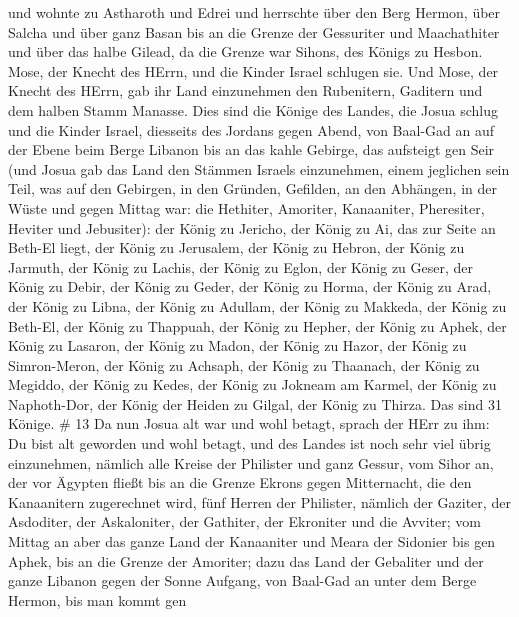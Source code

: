 und wohnte zu Astharoth und Edrei  und herrschte über den
Berg Hermon, über Salcha und über ganz Basan bis an die Grenze der
Gessuriter und Maachathiter und über das halbe Gilead, da die Grenze war
Sihons, des Königs zu Hesbon.  Mose, der Knecht des HErrn,
und die Kinder Israel schlugen sie. Und Mose, der Knecht des HErrn, gab
ihr Land einzunehmen den Rubenitern, Gaditern und dem halben Stamm
Manasse.  Dies sind die Könige des Landes, die Josua schlug
und die Kinder Israel, diesseits des Jordans gegen Abend, von Baal-Gad
an auf der Ebene beim Berge Libanon bis an das kahle Gebirge, das
aufsteigt gen Seir (und Josua gab das Land den Stämmen Israels
einzunehmen, einem jeglichen sein Teil,  was auf den
Gebirgen, in den Gründen, Gefilden, an den Abhängen, in der Wüste und
gegen Mittag war: die Hethiter, Amoriter, Kanaaniter, Pheresiter,
Heviter und Jebusiter):  der König zu Jericho, der König zu
Ai, das zur Seite an Beth-El liegt,  der König zu
Jerusalem, der König zu Hebron,  der König zu Jarmuth, der
König zu Lachis,  der König zu Eglon, der König zu Geser,
 der König zu Debir, der König zu Geder,  der
König zu Horma, der König zu Arad,  der König zu Libna, der
König zu Adullam,  der König zu Makkeda, der König zu
Beth-El,  der König zu Thappuah, der König zu Hepher,
 der König zu Aphek, der König zu Lasaron, 
der König zu Madon, der König zu Hazor,  der König zu
Simron-Meron, der König zu Achsaph,  der König zu Thaanach,
der König zu Megiddo,  der König zu Kedes, der König zu
Jokneam am Karmel,  der König zu Naphoth-Dor, der König der
Heiden zu Gilgal,  der König zu Thirza. Das sind 31 Könige.
\# 13  Da nun Josua alt war und wohl betagt, sprach der HErr
zu ihm: Du bist alt geworden und wohl betagt, und des Landes ist noch
sehr viel übrig einzunehmen,  nämlich alle Kreise der
Philister und ganz Gessur,  vom Sihor an, der vor Ägypten
fließt bis an die Grenze Ekrons gegen Mitternacht, die den Kanaanitern
zugerechnet wird, fünf Herren der Philister, nämlich der Gaziter, der
Asdoditer, der Askaloniter, der Gathiter, der Ekroniter und die Avviter;
 vom Mittag an aber das ganze Land der Kanaaniter und Meara
der Sidonier bis gen Aphek, bis an die Grenze der Amoriter; 
dazu das Land der Gebaliter und der ganze Libanon gegen der Sonne
Aufgang, von Baal-Gad an unter dem Berge Hermon, bis man kommt gen
